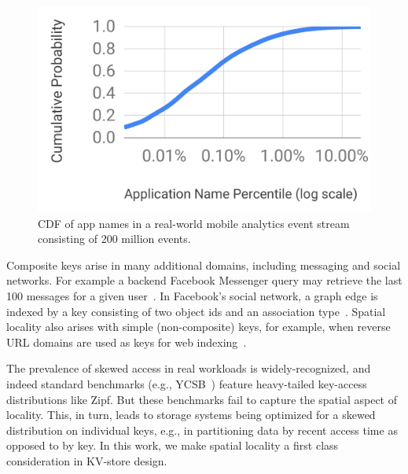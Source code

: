 

\begin{figure}[tb]
\centering
\includegraphics[width=0.7\columnwidth]{figs/cdf.pdf}
\caption{CDF of app names in a real-world mobile analytics event stream consisting of 200 million events. }
\label{fig:cdf}
\end{figure}

Composite keys arise in many additional domains, including messaging and social networks. 
For example a backend Facebook Messenger query may retrieve the last 100 messages for a 
given user~\cite{Borthakur:2011:AHG:1989323.1989438}. %
In Facebook's social network, a graph edge is indexed by a key consisting of two 
object ids and an association type~\cite{Armstrong:2013:LDB:2463676.2465296}.
Spatial locality   also arises with simple (non-composite) keys, for example, when 
reverse  URL domains are used as keys for web  indexing~\cite{Cho:1998:ECT:297805.297835}. 

The prevalence of skewed  access  in real workloads is widely-recognized, 
and indeed standard benchmarks (e.g., YCSB~\cite{YCSB})  feature heavy-tailed key-access distributions like Zipf.
But these benchmarks fail to capture the spatial aspect of locality.
This, in turn, leads to storage systems being optimized for a skewed distribution on individual keys, %
e.g., in partitioning data by recent access time as opposed to by key.
In this work, we make spatial locality a first class consideration in KV-store design.



